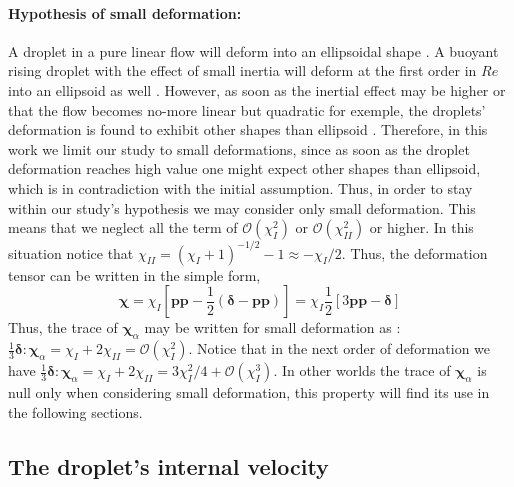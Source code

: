     
\paragraph*{Hypothesis of small deformation: }
A droplet in a pure linear flow will deform into an ellipsoidal shape \citet{leal2007advanced}. 
A buoyant rising droplet with the effect of small inertia will deform at the first order in $Re$ into an ellipsoid as well \citep{taylor1964deformation} .
However, as soon as the inertial effect may be higher or that the flow becomes no-more linear but quadratic for exemple, the droplets' deformation is found to exhibit other shapes than ellipsoid \citet{taylor1964deformation,stone1990simple}.
Therefore, in this work we limit our study to small deformations, since as soon as the droplet deformation reaches high value one might expect other shapes than ellipsoid, which is in contradiction with the initial assumption. 
Thus, in order to stay within our study's hypothesis we may consider only small deformation. 
This means that we neglect all the term of $\mathcal{O}(\chi_I^2)$ or $\mathcal{O}(\chi_{II}^2)$ or higher. 
In this situation notice that $\chi_{II} = (\chi_I + 1)^{-1/2} -1 \approx  - \chi_I /2$. 
Thus, the deformation tensor can be written in the simple form, 
\begin{equation*}
    \bm\chi 
    = \chi_I
    \left[
        \textbf{pp} 
        - \frac{1}{2}(\bm\delta - \textbf{pp})
    \right]
    = \chi_I \frac{1}{2} \left[
        3 \textbf{pp} - \bm\delta
    \right]
\end{equation*}
Thus, the trace of $\bm\chi_\alpha$ may be written for small deformation as :  $\frac{1}{3}\bm\delta:\bm\chi_\alpha  = \chi_I + 2\chi_{II} = \mathcal{O}(\chi_{I}^2)$. 
Notice that in the next order of deformation we have $\frac{1}{3}\bm\delta:\bm\chi_\alpha  = \chi_I + 2\chi_{II} = 3 \chi_I^2 /4 +  \mathcal{O}(\chi_{I}^3)$. 
In other worlds the trace of $\bm\chi_\alpha$ is null only when considering small deformation, this property will find its use in the following sections. 


\subsection{The droplet's internal velocity}

